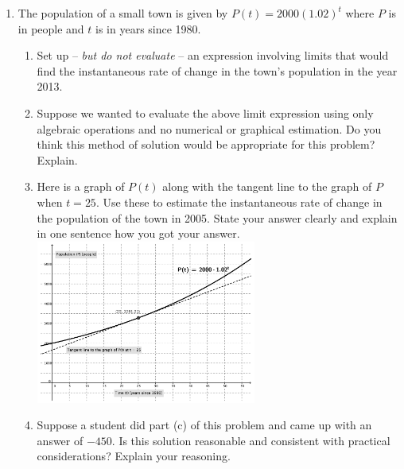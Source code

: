 \documentclass[11pt]{article}
\begin{document}
	
	
	
\begin{enumerate}
	
	
	\item The population of a small town is given by $P(t) = 2000(1.02)^t$ where $P$ is in people and $t$ is in years since 1980. 
	\begin{enumerate}
		\item Set up -- \emph{but do not evaluate} -- an expression involving limits that would find the instantaneous rate of change in the town's population in the year 2013. 
		\item Suppose we wanted to evaluate the above limit expression using only algebraic operations and no numerical or graphical estimation. Do you think this method of solution would be appropriate for this problem? Explain. 
		\item Here is a graph of $P(t)$ along with the tangent line to the graph of $P$ when $t = 25$. Use these to estimate the instantaneous rate of change in the population of the town in 2005. State your answer clearly and  explain in one sentence how you got your answer. 
		\includegraphics[width=0.6\textwidth]{a1-plot3}
		\item Suppose a student did part (c) of this problem and came up with an answer of $-450$. Is  this solution reasonable and consistent with practical considerations? Explain your reasoning. 
	\end{enumerate}



\end{enumerate}
\end{document}
